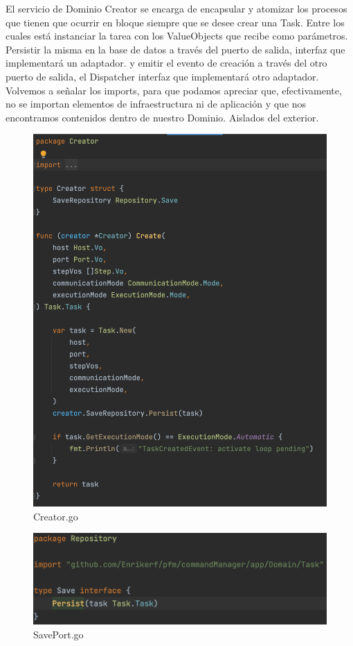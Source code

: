 El servicio de Dominio Creator se encarga de encapsular y atomizar los procesos que tienen que ocurrir en bloque siempre que se desee crear una Task. Entre los cuales está instanciar la tarea con los ValueObjects que recibe como parámetros. Persistir la misma en la base de datos a través del puerto de salida, interfaz que implementará un adaptador. y emitir el evento de creación a través del otro puerto de salida, el Dispatcher interfaz que implementará otro adaptador. Volvemos a señalar los imports, para que podamos apreciar que, efectivamente, no se importan elementos de infraestructura ni de aplicación y que nos encontramos contenidos dentro de nuestro Dominio. Aislados del exterior.

\begin{figure}[H]
    \centering
    \includegraphics[height=0.6\textheight]{./part/Ejecucion/Seguimiento/CreateTaskUseCase/img/PFM - creator}
    \caption{Creator.go}\label{fig:Creator}
\end{figure}

\begin{figure}[H]
    \centering
    \includegraphics[height=0.1\textheight]{./part/Ejecucion/Seguimiento/CreateTaskUseCase/img/PFM - SavePort}
    \caption{SavePort.go}\label{fig:SavePort}
\end{figure}

